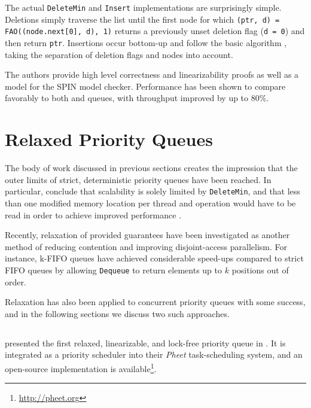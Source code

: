 \documentclass[a4paper,10pt]{article}
\begin{document}
The actual \lstinline|DeleteMin| and \lstinline|Insert| implementations are surprisingly simple.
Deletions simply traverse the list until the first node for which \lstinline|(ptr, d) = FAO((node.next[0], d), 1)|
returns a previously unset deletion flag (\lstinline|d = 0|) and then return \lstinline|ptr|.
Insertions occur bottom-up and follow the basic \citeauthor{fraser2004practical} algorithm \cite{fraser2004practical},
taking the separation of deletion flags and nodes into account.

The authors provide high level correctness and linearizability proofs as well as a model for the
SPIN model checker. Performance has been shown to compare favorably to both
\citeauthor{sundell2003fast} and \citeauthor{shavit2000skiplist} queues, with throughput improved by
up to $80\%$.

\section{Relaxed Priority Queues} \label{sec:relaxed}

The body of work discussed in previous sections
creates the impression that the outer limits of strict, deterministic priority queues have been reached.
In particular, \citeauthor{linden2013skiplist} conclude that scalability is solely limited by \lstinline|DeleteMin|,
and that less than one modified memory location per thread and operation would have to be read
in order to achieve improved performance \cite{linden2013skiplist}.

Recently, relaxation of provided guarantees have been investigated as another method of reducing
contention and improving disjoint-access parallelism.
For instance, k-FIFO queues \cite{kirsch2012fast} have achieved considerable
speed-ups compared to strict FIFO queues by allowing {\lstset{breaklines,breakatwhitespace} \lstinline|Dequeue|} to return elements
up to $k$ positions out of order.

Relaxation has also been applied to concurrent priority queues with some success, and in the following
sections we discuss two such approaches.

\subsection{\citeauthor{wimmer2013data}} \label{sec:wimmer}

\citeauthor{wimmer2013data} presented the first relaxed, linearizable, and lock-free priority queue
in \cite{wimmer2013data}. It is integrated as a priority scheduler into their \emph{Pheet} task-scheduling
system, and an open-source implementation is available\footnote{\url{http://pheet.org}}.
\end{document}
